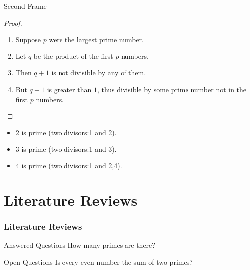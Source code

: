 \documentclass[10pt]{beamer}
\begin{document}
	\begin{frame}{Second Frame}
		\begin{proof}
			\begin{enumerate}
				\item<1-> Suppose $p$ were the largest prime number.
				\item<2-> Let $q$ be the product of the first $p$ numbers.
				\item<3-> Then $q + 1$ is not divisible by any of them.
				\item<1-> But $q + 1$ is greater than $1$, thus divisible by some prime number not in the first $p$ numbers.\qedhere
			\end{enumerate}
		\end{proof}
		\begin{itemize}
			\item 2 is prime (two divisors:1 and 2).
			\pause
			\item 3 is prime (two divisors:1 and 3).
			\pause
			\item 4 is prime (two divisors:1 and 2,4).
		\end{itemize}
	\end{frame}
	
	\section{Literature Reviews}
	\begin{frame}
		\frametitle{Literature Reviews}
		\begin{block}{Answered Questions}
			How many primes are there?\textcite{deng2014deep}
		\end{block}
		\begin{block}{Open Questions}
			Is every even number the sum of two primes?\parencite{mackenzie1992risk}
		\end{block}
	\end{frame}
	
\end{document}

